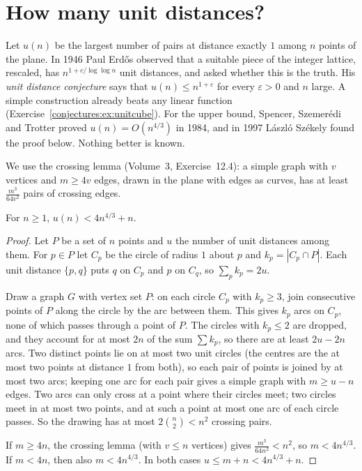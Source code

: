 \section{How many unit distances?}

Let $u(n)$ be the largest number of pairs at distance exactly $1$ among $n$ points of the plane. In 1946 Paul Erd\H os observed that a suitable piece of
the integer lattice, rescaled, has $n^{1+c/\log\log n}$ unit distances, and asked whether this is the truth. His \emph{unit distance conjecture} says
that $u(n)\le n^{1+\varepsilon}$ for every $\varepsilon>0$ and $n$ large. A simple construction already beats any linear function
(Exercise~\ref{conjectures:ex:unitcube}). For the upper bound, Spencer, Szemer\'edi and Trotter proved $u(n)=O(n^{4/3})$ in 1984, and in 1997 L\'aszl\'o Sz\'ekely
found the proof below. Nothing better is known.

We use the crossing lemma (Volume~3, Exercise~12.4): a simple graph with $v$ vertices and $m\ge4v$ edges, drawn in the plane with edges as curves, has at
least $\frac{m^3}{64v^2}$ pairs of crossing edges.

\begin{theorem}\label{conjectures:thm:unitdist}
For $n\ge1$, $u(n)<4n^{4/3}+n$.
\end{theorem}
\begin{proof}
Let $P$ be a set of $n$ points and $u$ the number of unit distances among them. For $p\in P$ let $C_p$ be the circle of radius $1$ about $p$ and
$k_p=|C_p\cap P|$. Each unit distance $\{p,q\}$ puts $q$ on $C_p$ and $p$ on $C_q$, so $\sum_pk_p=2u$.

Draw a graph $G$ with vertex set $P$: on each circle $C_p$ with $k_p\ge3$, join consecutive points of $P$ along the circle by the arc between them. This
gives $k_p$ arcs on $C_p$, none of which passes through a point of $P$. The circles with $k_p\le2$ are dropped, and they account for at most $2n$ of the
sum $\sum k_p$, so there are at least $2u-2n$ arcs. Two distinct points lie on at most two unit circles (the centres are the at most two points at
distance $1$ from both), so each pair of points is joined by at most two arcs; keeping one arc for each pair gives a simple graph with
$m\ge u-n$ edges. Two arcs can only cross at a point where their circles meet; two circles meet in at most two points, and at such a point at most one
arc of each circle passes. So the drawing has at most $2\binom n2<n^2$ crossing pairs.

If $m\ge4n$, the crossing lemma (with $v\le n$ vertices) gives $\frac{m^3}{64n^2}<n^2$, so $m<4n^{4/3}$. If $m<4n$, then also $m<4n^{4/3}$. In both cases
$u\le m+n<4n^{4/3}+n$.
\end{proof}

